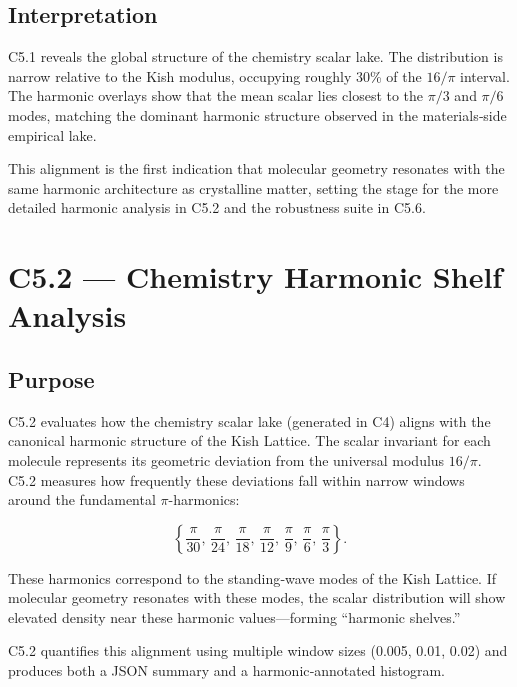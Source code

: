 \documentclass[11pt, letterpaper, openany]{book}
\begin{document}
\subsection*{Interpretation}
C5.1 reveals the global structure of the chemistry scalar lake. The distribution
is narrow relative to the Kish modulus, occupying roughly 30\% of the
\(16/\pi\) interval. The harmonic overlays show that the mean scalar lies closest
to the \(\pi/3\) and \(\pi/6\) modes, matching the dominant harmonic structure
observed in the materials‑side empirical lake.

This alignment is the first indication that molecular geometry resonates with
the same harmonic architecture as crystalline matter, setting the stage for the
more detailed harmonic analysis in C5.2 and the robustness suite in C5.6.


\section{C5.2 — Chemistry Harmonic Shelf Analysis}

\subsection*{Purpose}
C5.2 evaluates how the chemistry scalar lake (generated in C4) aligns with the
canonical harmonic structure of the Kish Lattice. The scalar invariant for each
molecule represents its geometric deviation from the universal modulus
\(16/\pi\). C5.2 measures how frequently these deviations fall within narrow
windows around the fundamental \(\pi\)-harmonics:



\[
\left\{ \frac{\pi}{30},\, \frac{\pi}{24},\, \frac{\pi}{18},\, \frac{\pi}{12},\,
\frac{\pi}{9},\, \frac{\pi}{6},\, \frac{\pi}{3} \right\}.
\]



These harmonics correspond to the standing‑wave modes of the Kish Lattice.  
If molecular geometry resonates with these modes, the scalar distribution will
show elevated density near these harmonic values—forming “harmonic shelves.”

C5.2 quantifies this alignment using multiple window sizes (0.005, 0.01, 0.02)
and produces both a JSON summary and a harmonic‑annotated histogram.
\end{document}
